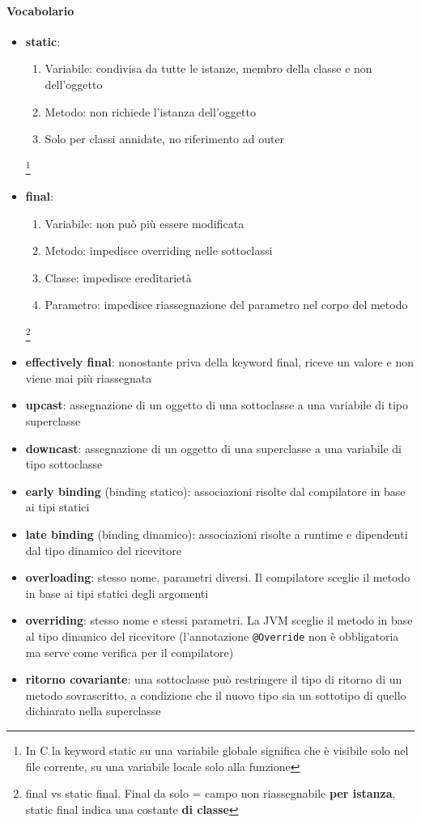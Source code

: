 \documentclass[12pt]{extarticle}
\begin{document}
\paragraph{Vocabolario}
\begin{itemize}
    \item \textbf{static}:
    \begin{enumerate}
        \item Variabile: condivisa da tutte le istanze, membro della classe e non dell'oggetto
        \item Metodo: non richiede l'istanza dell'oggetto
        \item Solo per classi annidate, no riferimento ad outer
    \end{enumerate}\footnote{In C la keyword static su una variabile globale significa che è visibile solo nel file corrente, su una variabile locale solo alla funzione}
    \item \textbf{final}:
    \begin{enumerate}
        \item Variabile: non può più essere modificata
        \item Metodo: impedisce overriding nelle sottoclassi
        \item Classe: impedisce ereditarietà
        \item Parametro: impedisce riassegnazione del parametro nel corpo del metodo
    \end{enumerate}\footnote{final vs static final. Final da solo = campo non riassegnabile \textbf{per istanza}, static final indica una costante \textbf{di classe}}
    \item \textbf{effectively final}: nonostante priva della keyword final, riceve un valore e non viene mai più riassegnata
    \item \textbf{upcast}: assegnazione di un oggetto di una sottoclasse a una variabile di tipo superclasse
    \item \textbf{downcast}: assegnazione di un oggetto di una superclasse a una variabile di tipo sottoclasse
    \item \textbf{early binding} (binding statico): associazioni risolte dal compilatore in base ai tipi statici
    \item \textbf{late binding} (binding dinamico): associazioni risolte a runtime e dipendenti dal tipo dinamico del ricevitore
    \item \textbf{overloading}: stesso nome, parametri diversi. Il compilatore sceglie il metodo in base ai tipi statici degli argomenti
    \item \textbf{overriding}: stesso nome e stessi parametri. La JVM sceglie il metodo in base al tipo dinamico del ricevitore (l'annotazione \texttt{@Override} non è obbligatoria ma serve come verifica per il compilatore)
    \item \textbf{ritorno covariante}: una sottoclasse può restringere il tipo di ritorno di un metodo sovrascritto, a condizione che il nuovo tipo sia un sottotipo di quello dichiarato nella superclasse
\end{itemize}
\end{document}
